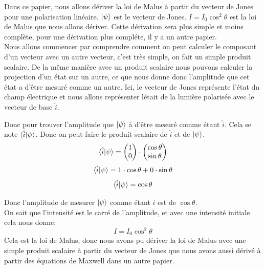 \documentclass{article}
\begin{document}
\DeclarePairedDelimiter\bra{\langle}{\rvert}
\DeclarePairedDelimiter\ket{\lvert}{\rangle}
\DeclarePairedDelimiterX{}

Dans ce papier, nous allons dériver la loi de Malus à partir du vecteur de Jones pour une polarisation linéaire. $ \ket{\psi} $ est le vecteur de Jones. $ I = I_0 \cos^2 \theta $ est la loi de Malus que nous allons dériver. Cette dérivation sera plus simple et moins complète, pour une dérivation plus compléte, il y a un autre papier.\\
Nous allons commencer par comprendre comment on peut calculer le composant d'un vecteur avec un autre vecteur, c'est très simple, on fait un simple produit scalaire. De la même manière avec un produit scalaire nous pouvons calculer la projection d'un état sur un autre, ce que nous donne donc l'amplitude que cet état a d'être mesuré comme un autre. Ici, le vecteur de Jones représente l'état du champ électrique et nous allons représenter létait de la lumière polarisée avec le vecteur de base $ \hat{i} $.

Donc pour trouver l'amplitude que $ \ket{\psi} $ à d'être mesuré comme étant $ \hat{i} $. Cela se note $ \langle \hat{i} \ket{\psi} $.
Donc on peut faire le produit scalaire de $ \hat{i} $ et de $ \ket{\psi} $.
$$ \langle \hat{i} \ket{\psi} = \begin{pmatrix} 1 \\ 0 \end{pmatrix} \cdot \begin{pmatrix} \cos \theta \\ \sin \theta \end{pmatrix} $$
$$ \langle \hat{i} \ket{\psi} = 1 \cdot \cos \theta + 0 \cdot \sin \theta $$
$$ \langle \hat{i} \ket{\psi} = \cos \theta $$

Donc l'amplitude de mesurer $ \ket{\psi} $ comme étant $ \hat{i} $ est de $ \cos \theta $. \\
On sait que l'intensité est le carré de l'amplitude, et avec une intensité initiale cela nous donne:
$$ I = I_0 \cos^2 \theta $$
Cela est la loi de Malus, donc nous avons pu dériver la loi de Malus avec une simple produit scalaire à partir du vecteur de Jones que nous avons aussi dérivé à partir des équations de Maxwell dans un autre papier.
\end{document}
